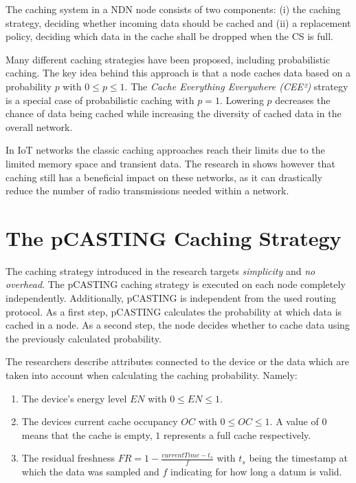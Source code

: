 \documentclass[conference]{IEEEtran}
\begin{document}
The caching system in a NDN node consists of two components: (i) the caching strategy, deciding whether incoming data should be cached and (ii) a replacement policy, deciding which data in the cache shall be dropped when the CS is full.

Many different caching strategies have been proposed, including probabilistic caching\cite{Tarnoi2014}. The key idea behind this approach is that a node caches data based on a probability $p$ with $0 \leq p \leq 1$. The \textit{Cache Everything Everywhere (CEE²)} strategy is a special case of probabilistic caching with $p = 1$. Lowering $p$ decreases the chance of data being cached while increasing the diversity of cached data in the overall network.

In IoT networks the classic caching approaches reach their limits due to the limited memory space and transient data. The research in \cite{Baccelli2014} shows however that caching still has a beneficial impact on these networks, as it can drastically reduce the number of radio transmissions needed within a network.

\section{The pCASTING Caching Strategy}
\label{sec:pcasting}

The caching strategy introduced in the research targets \textit{simplicity} and \textit{no overhead}. The pCASTING caching strategy is executed on each node completely independently. Additionally, pCASTING is independent from the used routing protocol\cite{Amadeo2014}. As a first step, pCASTING calculates the probability at which data is cached in a node. As a second step, the node decides whether to cache data using the previously calculated probability.

The researchers describe attributes connected to the device or the data which are taken into account when calculating the caching probability. Namely:
\begin{enumerate}
	\item The device's energy level $EN$ with $0 \leq EN \leq 1$.
	\item The devices current cache occupancy $OC$ with $0 \leq OC \leq 1$. A value of $0$ means that the cache is empty, $1$ represents a full cache respectively.
	\item The residual freshness $FR = 1 - \frac{currentTime - t_s}{f}$ with $t_s$ being the timestamp at which the data was sampled and $f$ indicating for how long a datum is valid.
\end{enumerate}
\end{document}
